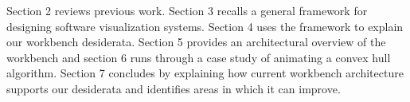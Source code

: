Section 2 reviews previous work. Section 3 recalls a general framework for
designing software visualization systems. Section 4 uses the framework to
explain our workbench desiderata. Section 5 provides an architectural overview
of the workbench and section 6 runs through a case study of animating a convex
hull algorithm. Section 7 concludes by explaining how current workbench
architecture supports our desiderata and identifies areas in which it can
improve.
